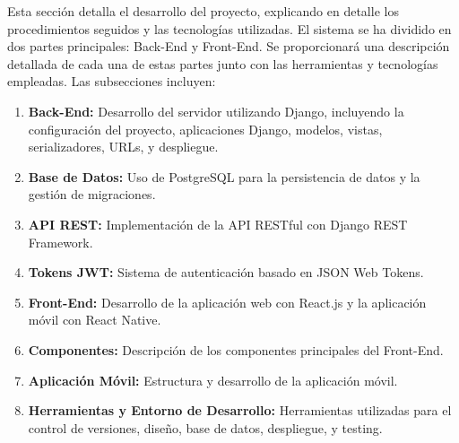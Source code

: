 Esta sección detalla el desarrollo del proyecto, explicando en detalle los procedimientos seguidos y las tecnologías utilizadas. El sistema se ha dividido en dos partes principales: Back-End y Front-End. Se proporcionará una descripción detallada de cada una de estas partes junto con las herramientas y tecnologías empleadas. Las subsecciones incluyen:

\begin{enumerate}
    \item \textbf{Back-End:} Desarrollo del servidor utilizando Django, incluyendo la configuración del proyecto, aplicaciones Django, modelos, vistas, serializadores, URLs, y despliegue.
    \item \textbf{Base de Datos:} Uso de PostgreSQL para la persistencia de datos y la gestión de migraciones.
    \item \textbf{API REST:} Implementación de la API RESTful con Django REST Framework.
    \item \textbf{Tokens JWT:} Sistema de autenticación basado en JSON Web Tokens.
    \item \textbf{Front-End:} Desarrollo de la aplicación web con React.js y la aplicación móvil con React Native.
    \item \textbf{Componentes:} Descripción de los componentes principales del Front-End.
    \item \textbf{Aplicación Móvil:} Estructura y desarrollo de la aplicación móvil.
    \item \textbf{Herramientas y Entorno de Desarrollo:} Herramientas utilizadas para el control de versiones, diseño, base de datos, despliegue, y testing.
\end{enumerate}